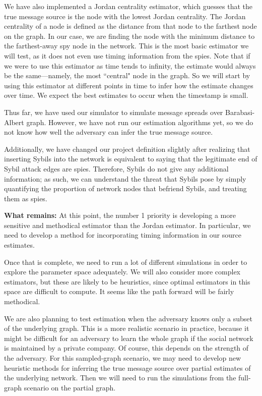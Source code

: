 \documentclass[11pt, onecolumn]{article}
\begin{document}
We have also implemented a Jordan centrality estimator, which guesses that the true message source is the node with the lowest Jordan centrality. The Jordan centrality of a node is defined as the distance from that node to the farthest node on the graph. In our case, we are finding the node with the minimum distance to the farthest-away spy node in the network. This is the most basic estimator we will test, as it does not even use timing information from the spies. Note that if we were to use this estimator as time tends to infinity, the estimate would always be the same---namely, the most ``central" node in the graph. So we will start by using this estimator at different points in time to infer how the estimate changes over time. We expect the best estimates to occur when the timestamp is small.

Thus far, we have used our simulator to simulate message spreads over Barabasi-Albert graph. However, we have not run our estimation algorithms yet, so we do not know how well the adversary can infer the true message source.

Additionally, we have changed our project definition slightly after realizing that inserting Sybils into the network is equivalent to saying that the legitimate end of Sybil attack edges are spies. Therefore, Sybils do not give any additional information; as such, we can understand the threat that Sybils pose by simply quantifying the proportion of network nodes that befriend Sybils, and treating them as spies. 

\vspace{0.1in}
\textbf{What remains:} At this point, the number 1 priority is developing a more sensitive and methodical estimator than the Jordan estimator. In particular, we need to develop a method for incorporating timing information in our source estimates. 

Once that is complete, we need to run a lot of different simulations in order to explore the parameter space adequately. We will also consider more complex estimators, but these are likely to be heuristics, since optimal estimators in this space are difficult to compute. It seems like the path forward will be fairly methodical.

We are also planning to test estimation when the adversary knows only a subset of the underlying graph. This is a more realistic scenario in practice, because it might be difficult for an adversary to learn the whole graph if the social network is maintained by a private company. Of course, this depends on the strength of the adversary. For this sampled-graph scenario, we may need to develop new heuristic methods for inferring the true message source over partial estimates of the underlying network. Then we will need to run the simulations from the full-graph scenario on the partial graph. 
\end{document}
